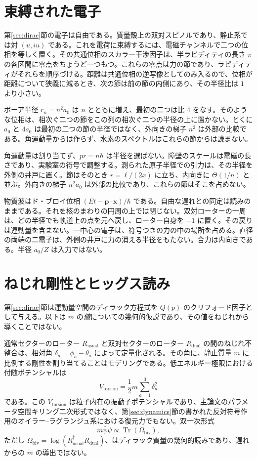 \documentclass[a4paper]{article}
\begin{document}
\section{束縛された電子}
\label{sec:orbit}

第\ref{sec:dirac}節の電子は自由である。質量殻上の双対スピノルであり、静止系では対 $(u,iu)$ である。これを電荷に束縛するには、電磁チャンネルで二つの位相を等しく置く。その共通位相のスカラー干渉因子は、半ラピディティの長さ $\pi$ の各区間に零点をちょうど一つもつ。これらの零点は力の節であり、ラピディティがそれらを順序づける。距離は共通位相の逆写像としてのみ入るので、位相が距離について狭義に減るとき、次の節は前の節の内側にあり、その半径比は $1$ より小さい。

ボーア半径 $r_n=n^2 a_0$ は $n$ とともに増え、最初の二つは比 $4$ をなす。そのような位相は、相次ぐ二つの節をこの列の相次ぐ二つの半径の上に置かない。とくに $a_0$ と $4a_0$ は最初の二つの節の半径ではなく、外向きの梯子 \(n^{2}\) は外部の比較である。角運動量からは作らず、水素のスペクトルはこれらの節からは読まない。

角運動量は割り当てず、\(pr=n\hbar\) は半径を選ばない。障壁のスケールは電磁の長さであり、実験室の符号で調整する。測られた原子半径での引力は、その半径を外側の井戸に置く。節はそのとき \(r=\ell/(2x)\) に立ち、内向きに \(\Theta(1/n)\) と並ぶ。外向きの梯子 \(n^{2}a_{0}\) は外部の比較であり、これらの節はそこを占めない。

物質波はド・ブロイ位相 \((Et-\mathbf{p}\cdot\mathbf{x})/\hbar\) である。自由な遅れとの同定は読みのままである。それを核のまわりの円周の上では閉じない。双対ローターの一周は、どの半径でも軌道上の点を元へ戻し、ローター自身を \(-1\) に置く。その戻りは運動量を含まない。一中心の電子は、符号つきの力の中の場所を占める。直径の両端の二電子は、外側の井戸に力の消える半径をもたない。合力は内向きである。半径 \(a_0/Z\) は入力ではない。

\section{ねじれ剛性とヒッグス読み}
\label{sec:mass}

第\ref{sec:dirac}節は運動量空間のディラック方程式を $Q(p)$ のクリフォード因子として与える。以下は $m$ の\emph{値}についての幾何的仮説であり、その値をねじれから導くことではない。

通常セクターのローター $R_\text{usual}$ と双対セクターのローター $R_\text{dual}$ の間のねじれ不整合は、相対角 $\delta_a = \phi_a - \theta_a$ によって定量化される。その角に、静止質量 $m$ に比例する剛性を割り当てることはモデリングである。低エネルギー極限における付随ポテンシャルは
\[
V_\text{torsion} = \frac{1}{2} m \sum_{a=1}^3 \delta_a^2
\]
である。この $V_{\mathrm{torsion}}$ は粒子内在の振動子ポテンシャルであり、主論文のパラメータ空間キリング二次形式ではなく、第\ref{sec:dynamics}節の書かれた反対符号作用のオイラー--ラグランジュ系における復元力でもない。双一次形式
\[
m \bar{\psi}\psi \propto \operatorname{Tr}(\Omega_\text{biv}),
\]
ただし $\Omega_{\mathrm{biv}}=\log(R_{\mathrm{usual}}^\dagger R_{\mathrm{dual}})$、はディラック質量の幾何的読みであり、遅れからの $m$ の導出ではない。
\end{document}
